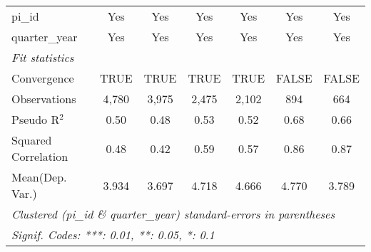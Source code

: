 \begin{tabular}{lcccccc}
   pi\_id                                                     & Yes           & Yes           & Yes           & Yes           & Yes            & Yes\\  
   quarter\_year                                              & Yes           & Yes           & Yes           & Yes           & Yes            & Yes\\  
   \midrule
   \emph{Fit statistics}\\
   Convergence                                                &TRUE           & TRUE          & TRUE          & TRUE          & FALSE          & FALSE\\  
   Observations                                               & 4,780         & 3,975         & 2,475         & 2,102         & 894            & 664\\  
   Pseudo R$^2$                                               & 0.50          & 0.48          & 0.53          & 0.52          & 0.68           & 0.66\\  
   Squared Correlation                                        & 0.48          & 0.42          & 0.59          & 0.57          & 0.86           & 0.87\\  
Mean(Dep. Var.) & 3.934 & 3.697 & 4.718 & 4.666 & 4.770 & 3.789 \\
   \midrule \midrule
   \multicolumn{7}{l}{\emph{Clustered (pi\_id \& quarter\_year) standard-errors in parentheses}}\\
   \multicolumn{7}{l}{\emph{Signif. Codes: ***: 0.01, **: 0.05, *: 0.1}}\\
\end{tabular}
\par\endgroup
